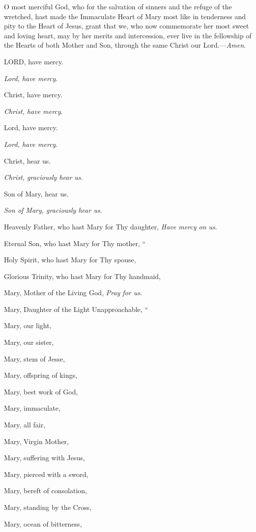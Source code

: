O most merciful God, who for the
salvation of sinners and the refuge of the wretched, hast made the
Immaculate Heart of Mary most like in tenderness and pity to the
Heart of Jesus, grant that we, who now commemorate her most sweet and
loving heart, may by her merits and intercession, ever live in the
fellowship of the Hearts of both Mother and Son, through the same Christ
our Lord.—\emph{Amen}.



LORD, have mercy.

\emph{Lord, have mercy}.

Christ, have mercy.

\emph{Christ, have mercy}.

Lord, have mercy.

\emph{Lord, have mercy}.

Christ, hear us.

\emph{Christ, graciously hear us}.

Son of Mary, hear us.

\emph{Son of Mary, graciously hear us}.

Heavenly Father, who hast Mary
for Thy daughter, \emph{Have mercy on us}.

Eternal Son, who hast Mary for Thy mother,
``

Holy Spirit, who hast Mary for Thy spouse,

Glorious Trinity, who hast Mary for Thy handmaid,

Mary, Mother of the Living God,
\emph{Pray for us}.

Mary, Daughter of the Light Unapproachable, ``

Mary, our light,

Mary, our sister,

Mary, stem of Jesse, 

Mary, offspring of kings,

Mary, best work of God,

Mary, immaculate,

Mary, all fair,

Mary, Virgin Mother,

Mary, suffering with Jesus,

Mary, pierced with a sword,

Mary, bereft of consolation,

Mary, standing by the Cross,

Mary, ocean of bitterness,

